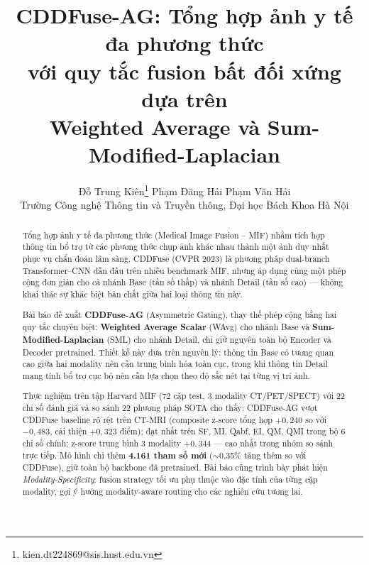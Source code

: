 \documentclass[12pt,a4paper]{article}
\begin{document}
\title{\Large CDDFuse-AG: Tổng hợp ảnh y tế đa phương thức\\
với quy tắc fusion bất đối xứng dựa trên\\
Weighted Average và Sum-Modified-Laplacian}

\author{
  Đỗ Trung Kiên\thanks{kien.dt224869@sis.hust.edu.vn} \quad
  Phạm Đăng Hải \quad
  Phạm Văn Hải\\[4pt]
  \normalsize Trường Công nghệ Thông tin và Truyền thông,
  Đại học Bách Khoa Hà Nội
}

\maketitle

\begin{abstract}
Tổng hợp ảnh y tế đa phương thức (Medical Image Fusion -- MIF) nhằm tích hợp thông
tin bổ trợ từ các phương thức chụp ảnh khác nhau thành một ảnh duy nhất phục vụ
chẩn đoán lâm sàng. CDDFuse (CVPR 2023) là phương pháp dual-branch Transformer--CNN
dẫn đầu trên nhiều benchmark MIF, nhưng áp dụng cùng một phép cộng đơn giản cho
cả nhánh Base (tần số thấp) và nhánh Detail (tần số cao) --- không khai thác sự
khác biệt bản chất giữa hai loại thông tin này.

Bài báo đề xuất \textbf{CDDFuse-AG} (Asymmetric Gating), thay thế phép cộng bằng
hai quy tắc chuyên biệt: \textbf{Weighted Average Scalar} (WAvg) cho nhánh Base
và \textbf{Sum-Modified-Laplacian} (SML) cho nhánh Detail, chỉ giữ nguyên toàn
bộ Encoder và Decoder pretrained. Thiết kế này dựa trên nguyên lý: thông tin
Base có tương quan cao giữa hai modality nên cần trung bình hóa toàn cục, trong
khi thông tin Detail mang tính bổ trợ cục bộ nên cần lựa chọn theo độ sắc nét
tại từng vị trí ảnh.

Thực nghiệm trên tập Harvard MIF (72 cặp test, 3 modality CT/PET/SPECT) với 22
chỉ số đánh giá và so sánh 22 phương pháp SOTA cho thấy: CDDFuse-AG vượt CDDFuse
baseline rõ rệt trên CT-MRI (composite z-score tổng hợp $+0{,}240$ so với
$-0{,}483$, cải thiện $+0{,}323$ điểm); đạt nhất trên SF, MI, Qabf, EI, QM, QMI
trong bộ 6 chỉ số chính; z-score trung bình 3 modality $+0{,}344$ --- cao nhất
trong nhóm so sánh trực tiếp. Mô hình chỉ thêm \textbf{4.161 tham số mới}
($\sim$0,35\% tăng thêm so với CDDFuse), giữ toàn bộ backbone đã pretrained.
Bài báo cũng trình bày phát hiện \emph{Modality-Specificity}: fusion strategy tối
ưu phụ thuộc vào đặc tính của từng cặp modality, gợi ý hướng modality-aware
routing cho các nghiên cứu tương lai.
\end{abstract}
\end{document}
